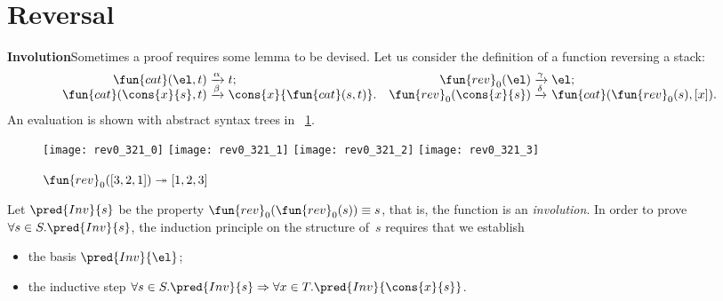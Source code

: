 \section{Reversal}
\label{sec:reversal}


\textbf{Involution}\quad Sometimes a
proof requires some lemma to be devised. Let us consider the
definition of a function
\label{def:rev0}
reversing a stack:
\begin{equation*}
\begin{array}{@{}r@{\;}l@{\;}lr@{\;}l@{\;}l@{}}
  \fun{cat}(\el,t)\index{cat@\fun{cat/2}}
& \xrightarrow{\smash{\alpha}} & t;
& \fun{rev}_0(\el)
& \xrightarrow{\smash{\gamma}} & \el;\\
  \fun{cat}(\cons{x}{s},t)
& \xrightarrow{\smash{\beta}} & \cons{x}{\fun{cat}(s,t)}.
& \fun{rev}_0(\cons{x}{s})
& \xrightarrow{\smash{\delta}} & \fun{cat}(\fun{rev}_0(s),[x]).
\end{array}
\end{equation*}
An evaluation is shown with abstract syntax trees in
\fig~\ref{fig:rev0_321}.
\begin{figure}[!b]
\centering
\texttt{[image: rev0\_321\_0]}
\texttt{[image: rev0\_321\_1]}
\texttt{[image: rev0\_321\_2]}
\texttt{[image: rev0\_321\_3]}
\caption{\(\fun{rev}_0([3,2,1]) \twoheadrightarrow [1,2,3]\)}
\label{fig:rev0_321}
\end{figure}
Let \(\pred{Inv}{s}\) be the property
\(\fun{rev}_0(\fun{rev}_0(s)) \equiv s\), that is, the function
 is an
\emph{involution}. In order to prove
\(\forall s \in S.\pred{Inv}{s}\), the induction principle on the
structure of~\(s\) requires that we
establish
\begin{itemize}

  \item the basis \(\pred{Inv}{\el}\);

  \item the inductive step \(\forall s \in S.\pred{Inv}{s}
    \Rightarrow \forall x \in T.\pred{Inv}{\cons{x}{s}}\).

\end{itemize}
